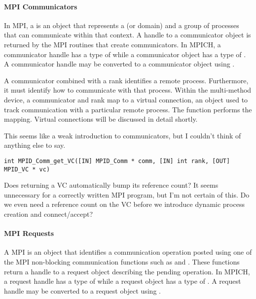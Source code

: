 
\paragraph{MPI Communicators}

In MPI, a  is an object that represents a
 (or domain) and a group of processes that can
communicate within that context.  A handle to a communicator object is returned
by the MPI routines that create communicators.  In MPICH, a communicator handle
has a type of  while a communicator object has a type of
.  A communicator handle may be converted to a communicator
object using .

A communicator combined with a rank identifies a remote process.  Furthermore,
it must identify how to communicate with that process.  Within the multi-method
device, a communicator and rank map to a virtual connection, an object used to
track communication with a particular remote process.  The function
 performs the mapping.  Virtual connections will be
discussed in detail shortly.

\begin{cmt}[BRT]
  This seems like a weak introduction to communicators, but I couldn't think of
  anything else to say.
\end{cmt}

\begin{verbatim}
int MPID_Comm_get_VC([IN] MPID_Comm * comm, [IN] int rank, [OUT] MPID_VC * vc)
\end{verbatim}

\begin{cmt}[BRT]
  Does returning a VC automatically bump its reference count?  It seems
  unnecessary for a correctly written MPI program, but I'm not certain of this.
  Do we even need a reference count on the VC before we introduce dynamic
  process creation and connect/accept?
\end{cmt}


\paragraph{MPI Requests}

A MPI  is an object that identifies a communication operation
posted using one of the MPI non-blocking communication functions such as
 and .  These functions return a handle to a
request object describing the pending operation.  In MPICH, a request handle
has a type of  while a request object has a type of
.  A request handle may be converted to a request object
using .

